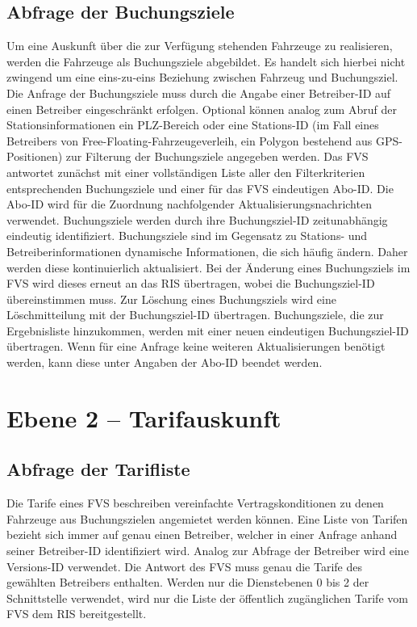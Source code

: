 \subsection{Abfrage der Buchungsziele}
Um eine Auskunft über die zur Verfügung stehenden Fahrzeuge zu realisieren, werden die Fahrzeuge als Buchungsziele abgebildet. Es handelt sich hierbei nicht zwingend um eine eins-zu-eins Beziehung zwischen Fahrzeug und Buchungsziel. Die Anfrage der Buchungsziele muss durch die Angabe einer Betreiber-ID auf einen Betreiber eingeschränkt erfolgen. Optional können analog zum Abruf der Stationsinformationen ein PLZ-Bereich oder eine Stations-ID (im Fall eines Betreibers von Free-Floating-Fahrzeugeverleih, ein Polygon bestehend aus GPS-Positionen) zur Filterung der Buchungsziele angegeben werden. Das FVS antwortet zunächst mit einer vollständigen Liste aller den Filterkriterien entsprechenden Buchungsziele und einer für das FVS eindeutigen Abo-ID. Die Abo-ID wird für die Zuordnung nachfolgender Aktualisierungsnachrichten verwendet. Buchungsziele werden durch ihre Buchungsziel-ID zeitunabhängig eindeutig identifiziert.
Buchungsziele sind im Gegensatz zu Stations- und Betreiberinformationen dynamische Informationen, die sich häufig ändern. Daher werden diese kontinuierlich aktualisiert.
Bei der Änderung eines Buchungsziels im FVS wird dieses erneut an das RIS übertragen, wobei die Buchungsziel-ID übereinstimmen muss.
Zur Löschung eines Buchungsziels wird eine Löschmitteilung mit der Buchungsziel-ID übertragen.
Buchungsziele, die zur Ergebnisliste hinzukommen, werden mit einer neuen eindeutigen Buchungsziel-ID übertragen. Wenn für eine Anfrage keine weiteren Aktualisierungen benötigt werden, kann diese unter Angaben der Abo-ID beendet werden.
 
\section{Ebene 2 -- Tarifauskunft}

\subsection{Abfrage der Tarifliste}
Die Tarife eines FVS beschreiben vereinfachte Vertragskonditionen zu denen Fahrzeuge aus Buchungszielen angemietet werden können.
Eine Liste von Tarifen bezieht sich immer auf genau einen Betreiber, welcher in einer Anfrage anhand seiner Betreiber-ID identifiziert wird. Analog zur Abfrage der Betreiber wird eine Versions-ID verwendet.
Die Antwort des FVS muss genau die Tarife des gewählten Betreibers enthalten.
Werden nur die Dienstebenen 0 bis 2 der Schnittstelle verwendet, wird nur die Liste der öffentlich zugänglichen Tarife vom FVS dem RIS bereitgestellt.

